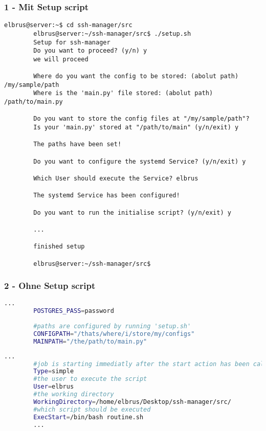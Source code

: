 \documentclass{article}
\begin{document}
	\subsubsection{1 - Mit Setup script}
	\lstset{style=commands}
	\begin{lstlisting}[caption={Ausführen des setup Scripts}]
		elbrus@server:~$ cd ssh-manager/src
		elbrus@server:~/ssh-manager/src$ ./setup.sh
		Setup for ssh-manager
		Do you want to proceed? (y/n) y
		we will proceed
		
		Where do you want the config to be stored: (abolut path) /my/sample/path
		Where is the 'main.py' file stored: (abolut path) /path/to/main.py
		
		Do you want to store the config files at "/my/sample/path"? 
		Is your 'main.py' stored at "/path/to/main" (y/n/exit) y
		
		The paths have been set!
		
		Do you want to configure the systemd Service? (y/n/exit) y
		
		Which User should execute the Service? elbrus
		
		The systemd Service has been configured!
		
		Do you want to run the initialise script? (y/n/exit) y
		
		...
		
		finished setup
		
		elbrus@server:~/ssh-manager/src$
	\end{lstlisting}
	
	\newpage
	\subsubsection{2 - Ohne Setup script}
	\lstset{style=files}
	\begin{lstlisting}[caption={'.env' - Datei anpassen}, language=bash, keywords={CONFIGPATH, MAINPATH}, keywordstyle=\color{red}, firstnumber=17]
		...
		POSTGRES_PASS=password
		
		#paths are configured by running 'setup.sh'
		CONFIGPATH="/thats/where/i/store/my/configs"
		MAINPATH="/the/path/to/main.py"
	\end{lstlisting}

	\begin{lstlisting}[caption={ssh-manager.service.example - Die Variable 'WorkingDirectory' sowie die Variable 'User' anpassen.},language=bash ,keywords={WorkingDirectory, User}, keywordstyle=\color{red}, firstnumber=5]
		...
		#job is starting immediatly after the start action has been called
		Type=simple
		#the user to execute the script
		User=elbrus
		#the working directory
		WorkingDirectory=/home/elbrus/Desktop/ssh-manager/src/
		#which script should be executed
		ExecStart=/bin/bash routine.sh
		...
	\end{lstlisting}
\end{document}
